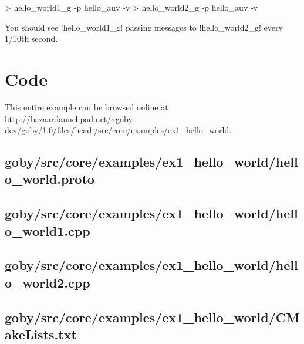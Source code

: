 \begin{boxedverbatim}
> hello_world1_g -p hello_auv -v
> hello_world2_g -p hello_auv -v
\end{boxedverbatim}
\resetbvlinenumber

You should see !hello_world1_g! passing messages to !hello_world2_g! every 1/10th second.

\section{Code} \label{sec:hello_example_code}

This entire example can be browsed online at \url{http://bazaar.launchpad.net/~goby-dev/goby/1.0/files/head:/src/core/examples/ex1_hello_world}.

\subsection{goby/src/core/examples/ex1\_hello\_world/hello\_world.proto} \label{sec:hello_world.proto}
\resetbvlinenumber

\subsection{goby/src/core/examples/ex1\_hello\_world/hello\_world1.cpp}\label{sec:hello_world1.cpp}
\resetbvlinenumber

\subsection{goby/src/core/examples/ex1\_hello\_world/hello\_world2.cpp}\label{sec:hello_world2.cpp}
\resetbvlinenumber
\subsection{goby/src/core/examples/ex1\_hello\_world/CMakeLists.txt}\label{sec:hello_world:CMakeLists.txt}
\resetbvlinenumber

\DeleteShortVerb{\!}
